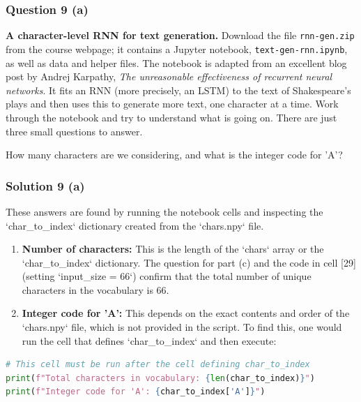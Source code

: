 \documentclass{article}
\begin{document}
{{{\subsubsection*{Question 9 (a)}
\begin{flushleft}
    \textbf{A character-level RNN for text generation.} Download the file \texttt{rnn-gen.zip} from the course webpage; 
    it contains a Jupyter notebook, \texttt{text-gen-rnn.ipynb}, as well as data and helper files. 
    The notebook is adapted from an excellent blog post by Andrej Karpathy, \textit{The unreasonable effectiveness of recurrent neural networks}. 
    It fits an RNN (more precisely, an LSTM) to the text of Shakespeare's plays and then uses this to generate more text, one character at a time. 
    Work through the notebook and try to understand what is going on. There are just three small questions to answer. 
    
    How many characters are we considering, and what is the integer code for 'A'? 
\end{flushleft}

\subsubsection*{Solution 9 (a)}
These answers are found by running the notebook cells and inspecting the `char_to_index` dictionary created from the `chars.npy` file.

\begin{enumerate}
    \item \textbf{Number of characters:} This is the length of the `chars` array or the `char_to_index` dictionary. The question for part (c) and the code in cell [29] (setting `input_size = 66`) confirm that the total number of unique characters in the vocabulary is 66.
    
    \item \textbf{Integer code for 'A':} This depends on the exact contents and order of the `chars.npy` file, which is not provided in the script. To find this, one would run the cell that defines `char_to_index` and then execute:
\end{enumerate}

\begin{lstlisting}[language=Python]
# This cell must be run after the cell defining char_to_index
print(f"Total characters in vocabulary: {len(char_to_index)}")
print(f"Integer code for 'A': {char_to_index['A']}")
\end{lstlisting}

}}}
\end{document}
